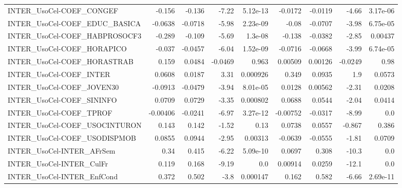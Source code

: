 \begin{tabular}{lrrrrrrrr}
INTER\_UsoCel-COEF\_CONGEF              &      -0.156 &       -0.136 &   -7.22 & 5.12e-13 &    -0.0172 &     -0.0119 &        -4.66 &      3.17e-06 \\
INTER\_UsoCel-COEF\_EDUC\_BASICA         &     -0.0638 &      -0.0718 &   -5.98 & 2.23e-09 &      -0.08 &     -0.0707 &        -3.98 &      6.75e-05 \\
INTER\_UsoCel-COEF\_HABPROSOCF3         &      -0.289 &       -0.109 &   -5.69 &  1.3e-08 &     -0.138 &     -0.0382 &        -2.85 &       0.00437 \\
INTER\_UsoCel-COEF\_HORAPICO            &      -0.037 &      -0.0457 &   -6.04 & 1.52e-09 &    -0.0716 &     -0.0668 &        -3.99 &      6.74e-05 \\
INTER\_UsoCel-COEF\_HORASTRAB           &       0.159 &       0.0484 & -0.0469 &    0.963 &    0.00509 &     0.00126 &      -0.0249 &          0.98 \\
INTER\_UsoCel-COEF\_INTER               &      0.0608 &       0.0187 &    3.31 & 0.000926 &      0.349 &      0.0935 &          1.9 &        0.0573 \\
INTER\_UsoCel-COEF\_JOVEN30             &     -0.0913 &      -0.0479 &   -3.94 & 8.01e-05 &     0.0128 &     0.00562 &        -2.31 &        0.0208 \\
INTER\_UsoCel-COEF\_SININFO             &      0.0709 &       0.0729 &   -3.35 & 0.000802 &     0.0688 &      0.0544 &        -2.04 &        0.0414 \\
INTER\_UsoCel-COEF\_TPROF               &    -0.00406 &      -0.0241 &   -6.97 & 3.27e-12 &   -0.00752 &     -0.0317 &        -8.99 &           0.0 \\
INTER\_UsoCel-COEF\_USOCINTURON         &       0.143 &        0.142 &   -1.52 &     0.13 &     0.0738 &      0.0557 &       -0.867 &         0.386 \\
INTER\_UsoCel-COEF\_USODISPMOB          &      0.0855 &       0.0944 &   -2.95 &  0.00313 &    -0.0639 &     -0.0555 &        -1.81 &        0.0709 \\
INTER\_UsoCel-INTER\_AFrSem             &        0.34 &        0.415 &   -6.22 & 5.09e-10 &     0.0697 &       0.308 &        -10.3 &           0.0 \\
INTER\_UsoCel-INTER\_CulFr              &       0.119 &        0.168 &   -9.19 &      0.0 &    0.00914 &      0.0259 &        -12.1 &           0.0 \\
INTER\_UsoCel-INTER\_EnfCond            &       0.372 &        0.502 &    -3.8 & 0.000147 &      0.162 &       0.582 &        -6.66 &      2.69e-11 \\

\end{tabular}
